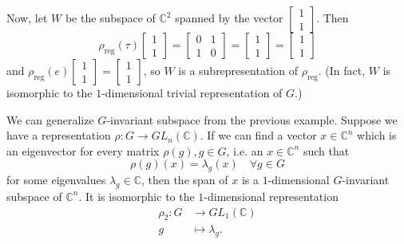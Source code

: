 \begin{example}
Now, let $W$ be the subspace of $\mathbb{C}^2$ spanned by the vector $\begin{bmatrix}1 \\ 1  \end{bmatrix}$. Then
\[ \rho_{\text{reg}}(\tau)  \begin{bmatrix}1 \\ 1  \end{bmatrix} =   \begin{bmatrix} 0 & 1 \\ 1 & 0 \end{bmatrix} = \begin{bmatrix}1 \\ 1  \end{bmatrix} = \begin{bmatrix}1 \\ 1  \end{bmatrix} \]
and  $\rho_{\text{reg}}(e) \begin{bmatrix}1 \\ 1  \end{bmatrix} = \begin{bmatrix}1 \\ 1  \end{bmatrix} $, so $W$ is a subrepresentation of $\rho_{\text{reg}}$.  (In fact, $W$ is isomorphic to the $1$-dimensional trivial representation of $G$.)
\end{example}

\begin{example}
We can generalize $G$-invariant subspace from the previous example.  Suppose we have a representation $\rho \colon G
\to GL_n
(\mathbb{C})$.  If
we can find a vector $x \in \mathbb{C}^n$ which is an eigenvector for every matrix $\rho(g), g \in G$,
i.e. an $x \in \mathbb{C}^n$ such that
\[ \rho(g) (x) = \lambda_g (x) \quad \forall g \in G\]
for some eigenvalues $\lambda_g \in \mathbb{C}$, then the span of $x$ is a $1$-dimensional $G$-invariant
subspace
 of $\mathbb{C}^n$.  It is isomorphic to the $1$-dimensional representation
\begin{align*}
 \rho_2 \colon G &\to GL_1 (\mathbb{C}) \\
g &\mapsto \lambda_g.
\end{align*}
\end{example}


